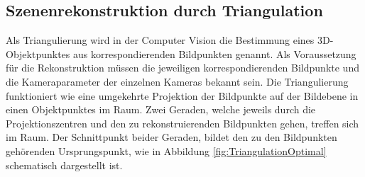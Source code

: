 



\subsection{Szenenrekonstruktion durch Triangulation}

Als Triangulierung wird in der Computer Vision die Bestimmung eines 3D-Objektpunktes aus korrespondierenden Bildpunkten genannt. Als Voraussetzung für die Rekonstruktion müssen die jeweiligen korrespondierenden Bildpunkte und die Kameraparameter der einzelnen Kameras bekannt sein. Die Triangulierung funktioniert wie eine umgekehrte Projektion der Bildpunkte auf der Bildebene in einen Objektpunktes im Raum. Zwei Geraden, welche jeweils durch die Projektionszentren und den zu rekonstruierenden Bildpunkten gehen,  treffen sich im Raum. Der Schnittpunkt beider Geraden, bildet den zu den Bildpunkten gehörenden Ursprungspunkt, wie in Abbildung \ref{fig:TriangulationOptimal} schematisch dargestellt ist.  \\\\




